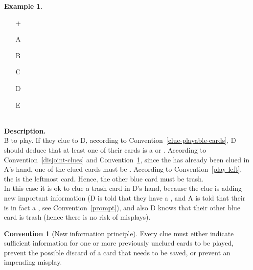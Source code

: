 \documentclass[a4paper]{article}
\theoremstyle{plain}
\theoremstyle{definition}
\newtheorem{example}[theorem]{Example}
\newtheorem{convention}[theorem]{Convention}
\begin{document}
\begin{example} \hfill \\
	\begin{minipage}{0.45\textwidth}
		\begin{itemize}
			\item[\Large +]      
			\item[\Large A]    
			\item[\Large B]    
			\item[\Large C]    
			\item[\Large D]    
			\item[\Large E]    
		\end{itemize}
	\end{minipage}%
	\begin{minipage}{0.55\textwidth}
		\hfill \\
		
		\textbf{Description.} \\
		
		B to play. If they clue  to D, according to Convention~\ref{clue-playable-cards}, D should deduce that at least one of their cards is a  or . According to Convention~\ref{disjoint-clues} and Convention~\ref{new-information}, since the  has already been clued in A's hand, one of the clued cards must be . According to Convention~\ref{play-left}, the  is the leftmost card. Hence, the other blue card must be trash. \\
	
		In this case it is ok to clue a trash card in D's hand, because the clue is adding new important information (D is told that they have a , and A is told that their  is in fact a , see Convention~\ref{prompt}), and also D knows that their other blue card is trash (hence there is no risk of misplays).
	\end{minipage}
\end{example} \vspace{0.15 cm}

\begin{convention}[New information principle]
	\label{new-information}
	Every clue must either indicate sufficient information for one or more previously unclued cards to be played, prevent the possible discard of a card that needs to be saved, or prevent an impending misplay.
\end{convention}
\end{document}
